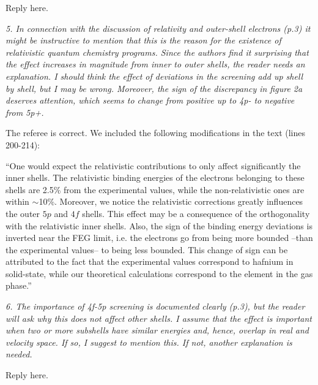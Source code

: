 \documentclass[a4paper,10pt]{article}
\begin{document}
\vspace{0.1cm}
{\color{red}Reply here.}

\vspace{0.25cm}
\textsl{5. In connection with the discussion of relativity and 
outer-shell electrons (p.3) it might be instructive to mention that 
this is the reason for the existence of relativistic quantum chemistry 
programs. Since the authors find it surprising that the effect increases 
in magnitude from inner to outer shells, the reader needs an 
explanation. I should think the effect of deviations in the screening 
add up shell by shell, but I may be wrong. Moreover, the sign of the 
discrepancy in figure 2a deserves attention, which seems to change from 
positive up to 4p- to negative from 5p+.}

\vspace{0.1cm}
The referee is correct. We included the following modifications in the text
(lines 200-214):

\vspace{0.1cm}
{\small ``One would expect the relativistic contributions to only affect 
significantly the inner shells. The relativistic binding energies of the 
electrons belonging to these shells are 2.5\% from the experimental values,
while the non-relativistic ones are within $\sim$10\%. Moreover, we notice 
the relativistic corrections greatly influences the outer $5p$ and $4f$ 
shells. This effect may be a consequence of the orthogonality with the 
relativistic inner shells. Also, the sign of the binding energy deviations 
is inverted near the FEG limit, i.e. the electrons go from being more 
bounded --than the experimental values-- to being less bounded. 
This change of sign can be attributed to the fact that the experimental 
values correspond to hafnium in solid-state, while our theoretical 
calculations correspond to the element in the gas phase.''}

\vspace{0.25cm}
\textsl{6. The importance of 4f-5p screening is documented clearly 
(p.3), but the reader will ask why this does not affect other shells. 
I assume that the effect is important when two or more subshells have 
similar energies and, hence, overlap in real and velocity space. If so, 
I suggest to mention this. If not, another explanation is needed.}

\vspace{0.1cm}
{\color{red}Reply here.}
\end{document}
